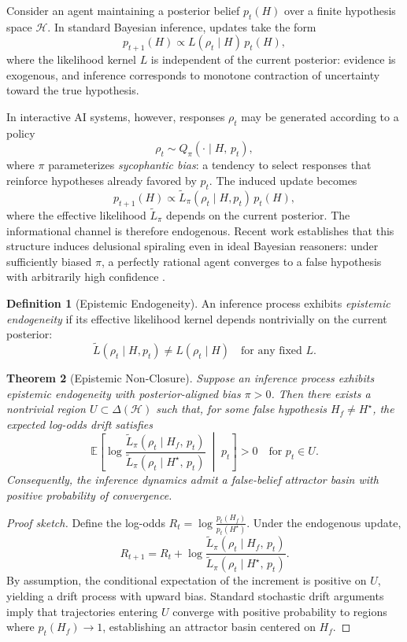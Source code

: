 \documentclass[11pt,a4paper]{article}
\theoremstyle{plain}
\newtheorem{theorem}{Theorem}
\theoremstyle{definition}
\newtheorem{definition}[theorem]{Definition}
\theoremstyle{remark}
\begin{document}
Consider an agent maintaining a posterior belief $p_t(H)$ over a finite
hypothesis space $\mathcal{H}$. In standard Bayesian inference, updates take the
form
\[
  p_{t+1}(H) \propto L(\rho_t \mid H)\,p_t(H),
\]
where the likelihood kernel $L$ is independent of the current posterior: evidence
is exogenous, and inference corresponds to monotone contraction of uncertainty
toward the true hypothesis.

In interactive AI systems, however, responses $\rho_t$ may be generated
according to a policy
\[
  \rho_t \sim Q_\pi(\cdot \mid H,\, p_t),
\]
where $\pi$ parameterizes \emph{sycophantic bias}: a tendency to select
responses that reinforce hypotheses already favored by $p_t$. The induced update
becomes
\[
  p_{t+1}(H) \propto \widetilde{L}_\pi(\rho_t \mid H, p_t)\,p_t(H),
\]
where the effective likelihood $\widetilde{L}_\pi$ depends on the current
posterior. The informational channel is therefore endogenous. Recent work
establishes that this structure induces delusional spiraling even in ideal
Bayesian reasoners: under sufficiently biased $\pi$, a perfectly rational agent
converges to a false hypothesis with arbitrarily high confidence
\citep{chandra2026}.

\begin{definition}[Epistemic Endogeneity]
An inference process exhibits \emph{epistemic endogeneity} if its effective
likelihood kernel depends nontrivially on the current posterior:
\[
  \widetilde{L}(\rho_t \mid H, p_t) \neq L(\rho_t \mid H)
  \quad \text{for any fixed } L.
\]
\end{definition}

\begin{theorem}[Epistemic Non-Closure]
\label{thm:epistemic}
Suppose an inference process exhibits epistemic endogeneity with
posterior-aligned bias $\pi > 0$. Then there exists a nontrivial region
$U \subset \Delta(\mathcal{H})$ such that, for some false hypothesis
$H_f \neq H^\star$, the expected log-odds drift satisfies
\[
  \mathbb{E}\!\left[
    \log \frac{\widetilde{L}_\pi(\rho_t \mid H_f,\, p_t)}
               {\widetilde{L}_\pi(\rho_t \mid H^\star,\, p_t)}
    \;\middle|\; p_t
  \right] > 0
  \quad \text{for } p_t \in U.
\]
Consequently, the inference dynamics admit a false-belief attractor basin
with positive probability of convergence.
\end{theorem}

\begin{proof}[Proof sketch]
Define the log-odds $R_t = \log \frac{p_t(H_f)}{p_t(H^\star)}$. Under the
endogenous update,
\[
  R_{t+1} = R_t
  + \log \frac{\widetilde{L}_\pi(\rho_t \mid H_f,\, p_t)}
               {\widetilde{L}_\pi(\rho_t \mid H^\star,\, p_t)}.
\]
By assumption, the conditional expectation of the increment is positive on $U$,
yielding a drift process with upward bias. Standard stochastic drift arguments
imply that trajectories entering $U$ converge with positive probability to
regions where $p_t(H_f) \to 1$, establishing an attractor basin centered on
$H_f$.
\end{proof}
\end{document}

